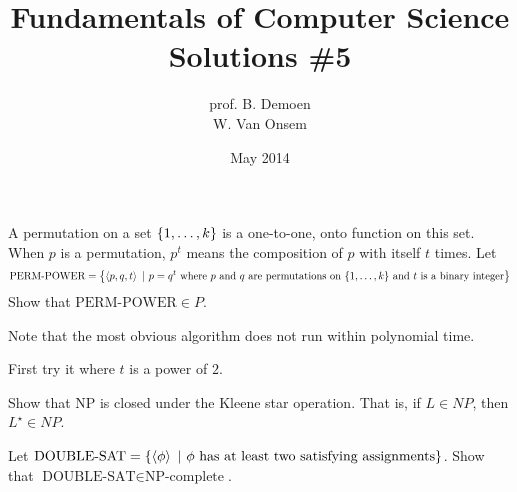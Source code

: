 \documentclass{article}
\title{Fundamentals of Computer Science\\Solutions \#5}
\author{prof. B. Demoen\\W. Van Onsem}
\date{May 2014}
\begin{document}
\maketitle
\begin{exercise}
A permutation on a set $\left\{ 1,\ldots,k \right\}$ is a one-to-one, onto function on this set. When $p$ is a permutation, $p^t$ means the composition of $p$ with itself $t$ times. Let
\begin{equation}
\mbox{PERM-POWER}=\left\{ \left\langle p, q, t \right\rangle\ |\ p = q^t\mbox{ where $p$ and $q$ are permutations on $\left\{ 1,\ldots,k \right\}$ and $t$ is a binary integer} \right\}
\end{equation}
Show that $\mbox{PERM-POWER}\in P$.
\begin{note}
Note that the most obvious algorithm does not run within polynomial time.
\end{note}
\begin{hint}
First try it where $t$ is a power of $2$.
\end{hint}
\end{exercise}

\begin{exercise}
Show that NP is closed under the Kleene star operation. That is, if $L\in NP$, then $L^{\star}\in NP$.
\end{exercise}

\begin{exercise}
Let $\mbox{DOUBLE-SAT}=\left\{ \left\langle \phi \right\rangle\ |\ \phi\mbox{ has at least two satisfying assignments} \right\}$. Show that $\mbox{DOUBLE-SAT}\in\mbox{NP-complete}$.
\end{exercise}
\end{document}

